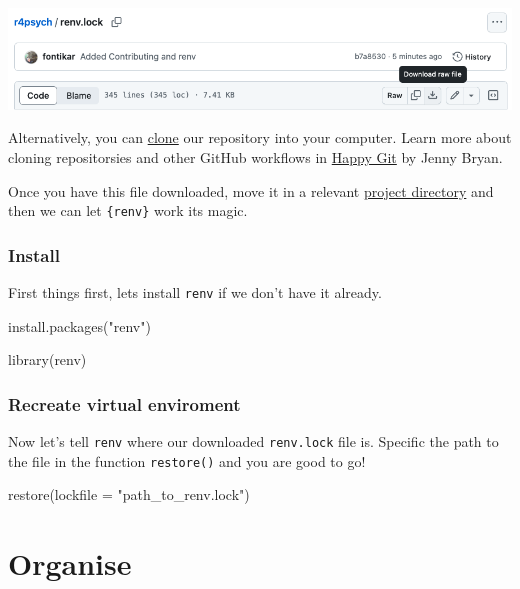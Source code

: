 \documentclass[
  letterpaper,
  DIV=11,
  numbers=noendperiod]{scrreprt}
\newenvironment{Shaded}{\begin{snugshade}}{\end{snugshade}}
\newcommand{\AttributeTok}[1]{\textcolor[rgb]{0.40,0.45,0.13}{#1}}
\newcommand{\FunctionTok}[1]{\textcolor[rgb]{0.28,0.35,0.67}{#1}}
\newcommand{\NormalTok}[1]{\textcolor[rgb]{0.00,0.23,0.31}{#1}}
\newcommand{\StringTok}[1]{\textcolor[rgb]{0.13,0.47,0.30}{#1}}
\begin{document}
\includegraphics{images/renv.png}

Alternatively, you can
\href{https://happygitwithr.com/clone.html?q=clone\#clone}{clone} our
repository into your computer. Learn more about cloning repositorsies
and other GitHub workflows in \href{https://happygitwithr.com/}{Happy
Git} by Jenny Bryan.

Once you have this file downloaded, move it in a relevant
\href{}{project directory} and then we can let \texttt{\{renv\}} work
its magic.

\subsection{Install}\label{install}

First things first, lets install \texttt{renv} if we don't have it
already.

\begin{Shaded}
\begin{Highlighting}[]
\FunctionTok{install.packages}\NormalTok{(}\StringTok{"renv"}\NormalTok{)}

\FunctionTok{library}\NormalTok{(renv)}
\end{Highlighting}
\end{Shaded}

\subsection{Recreate virtual
enviroment}\label{recreate-virtual-enviroment}

Now let's tell \texttt{renv} where our downloaded \texttt{renv.lock}
file is. Specific the path to the file in the function
\texttt{restore()} and you are good to go!

\begin{Shaded}
\begin{Highlighting}[]
\FunctionTok{restore}\NormalTok{(}\AttributeTok{lockfile =} \StringTok{"path\_to\_renv.lock"}\NormalTok{)}
\end{Highlighting}
\end{Shaded}


\chapter{Organise}\label{organise}
\end{document}
